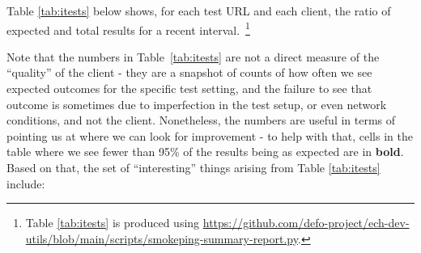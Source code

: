 Table \ref{tab:itests} below shows, for each test URL and each client,
the ratio of expected and total results for a recent 
interval.~\footnote{Table \ref{tab:itests} is produced
using \url{https://github.com/defo-project/ech-dev-utils/blob/main/scripts/smokeping-summary-report.py}.}

\begin{center}
    
\end{center}

Note that the numbers in Table~\ref{tab:itests} are not a direct measure of the
``quality'' of the client - they are a snapshot of counts of how often we see expected
outcomes for the specific test setting, and the failure to see that outcome is
sometimes due to imperfection in the test setup, or even network conditions,
and not the client.  Nonetheless, the numbers are useful in terms of pointing
us at where we can look for improvement - to help with that, cells in the table
where we see fewer than 95\% of the results being as expected are in
\textbf{bold}.  Based on that, the set of ``interesting'' things arising from
Table \ref{tab:itests} include:

